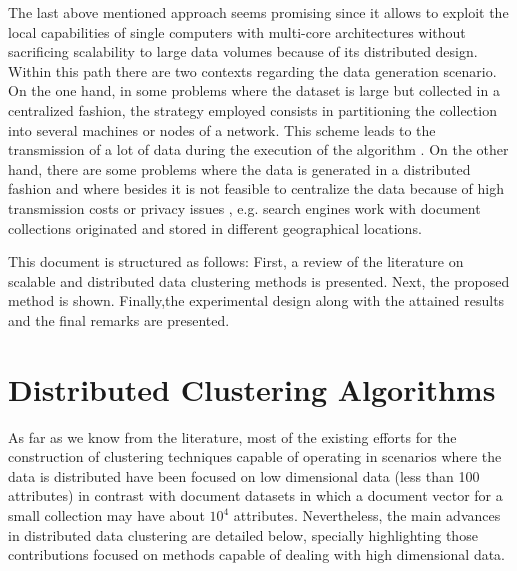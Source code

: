 \documentclass[a4paper]{article}
\begin{document}
The last above mentioned approach seems promising since it allows to exploit the local capabilities of single computers with multi-core architectures without sacrificing scalability to large data volumes because of its distributed design. Within this path there are two contexts regarding the data generation scenario. On the one hand, in some problems where the dataset is large but collected in a centralized fashion, the strategy employed consists in partitioning the collection into several machines or nodes of a network. This scheme leads to the transmission of a lot of data during the execution of the algorithm \cite{N15}. On the other hand, there are some problems where the data is generated in a distributed fashion and where besides it is not feasible to centralize the data because of high transmission costs or privacy issues \cite{JW05,LHLX12}, e.g. search engines work with document collections originated and stored in different geographical locations.

This document is structured as follows: First, a review of the literature on scalable and distributed data clustering methods is presented. Next, the proposed method is shown. Finally,the experimental design along with the attained results and the final remarks are presented. 

\section{Distributed Clustering Algorithms}
As far as we know from the literature, most of the existing efforts for the construction of clustering techniques capable of operating in scenarios where the data is distributed have been focused on low dimensional data (less than 100 attributes) in contrast with document datasets in which a document vector for a small collection may have about $10^4$ attributes. Nevertheless, the main advances in distributed data clustering are detailed below, specially highlighting those contributions focused on methods capable of dealing with high dimensional data.
\end{document}
